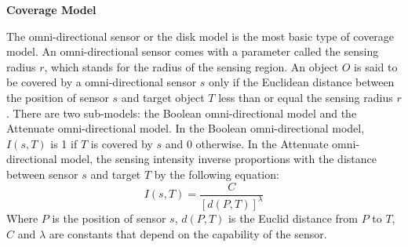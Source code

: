 \documentclass[final]{elsarticle}
\begin{document}
\textbf{Coverage Model}

The omni-directional sensor or the disk model is the most basic type of coverage model. An omni-directional sensor comes with a parameter called the sensing radius $r$, which stands for the radius of the sensing region. An object $ O $ is said to be covered by a omni-directional sensor $ s $ only if the Euclidean distance between the position of sensor $ s $ and target object $ T $ less than or equal the sensing radius $r$. There are two sub-models: the Boolean omni-directional model and the Attenuate omni-directional model. In the Boolean omni-directional model, $I(s, T)$ is 1 if $ T $ is covered by $ s $ and 0 otherwise. In the Attenuate omni-directional model, the sensing intensity inverse proportions with the distance between sensor $ s $ and target $ T $ by the following equation:
\begin{equation}
\label{eqfo}
I({s},T) = \frac{C}{{{{\left[ {d(P,T)} \right]}^\lambda }}}
\end{equation}
Where $ P $ is the position of sensor $ s $, $ d(P,T) $ is the Euclid distance from $ P $ to $ T $, $ C $ and $ \lambda $ are constants that depend on the capability of the sensor. 
\end{document}
